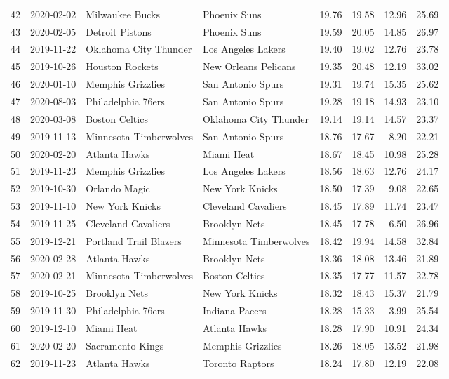 \documentclass[
  11pt,
]{article}
\theoremstyle{nonumberplain}
\begin{document}
\begin{longtable}{rl|llr|rrr}
42 & 2020-02-02 & Milwaukee Bucks & Phoenix Suns & 19.76 & 19.58 & 12.96 & 25.69\\
43 & 2020-02-05 & Detroit Pistons & Phoenix Suns & 19.59 & 20.05 & 14.85 & 26.97\\
44 & 2019-11-22 & Oklahoma City Thunder & Los Angeles Lakers & 19.40 & 19.02 & 12.76 & 23.78\\
45 & 2019-10-26 & Houston Rockets & New Orleans Pelicans & 19.35 & 20.48 & 12.19 & 33.02\\
46 & 2020-01-10 & Memphis Grizzlies & San Antonio Spurs & 19.31 & 19.74 & 15.35 & 25.62\\
47 & 2020-08-03 & Philadelphia 76ers & San Antonio Spurs & 19.28 & 19.18 & 14.93 & 23.10\\
48 & 2020-03-08 & Boston Celtics & Oklahoma City Thunder & 19.14 & 19.14 & 14.57 & 23.37\\
49 & 2019-11-13 & Minnesota Timberwolves & San Antonio Spurs & 18.76 & 17.67 & 8.20 & 22.21\\
50 & 2020-02-20 & Atlanta Hawks & Miami Heat & 18.67 & 18.45 & 10.98 & 25.28\\
51 & 2019-11-23 & Memphis Grizzlies & Los Angeles Lakers & 18.56 & 18.63 & 12.76 & 24.17\\
52 & 2019-10-30 & Orlando Magic & New York Knicks & 18.50 & 17.39 & 9.08 & 22.65\\
53 & 2019-11-10 & New York Knicks & Cleveland Cavaliers & 18.45 & 17.89 & 11.74 & 23.47\\
54 & 2019-11-25 & Cleveland Cavaliers & Brooklyn Nets & 18.45 & 17.78 & 6.50 & 26.96\\
55 & 2019-12-21 & Portland Trail Blazers & Minnesota Timberwolves & 18.42 & 19.94 & 14.58 & 32.84\\
56 & 2020-02-28 & Atlanta Hawks & Brooklyn Nets & 18.36 & 18.08 & 13.46 & 21.89\\
57 & 2020-02-21 & Minnesota Timberwolves & Boston Celtics & 18.35 & 17.77 & 11.57 & 22.78\\
58 & 2019-10-25 & Brooklyn Nets & New York Knicks & 18.32 & 18.43 & 15.37 & 21.79\\
59 & 2019-11-30 & Philadelphia 76ers & Indiana Pacers & 18.28 & 15.33 & 3.99 & 25.54\\
60 & 2019-12-10 & Miami Heat & Atlanta Hawks & 18.28 & 17.90 & 10.91 & 24.34\\
61 & 2020-02-20 & Sacramento Kings & Memphis Grizzlies & 18.26 & 18.05 & 13.52 & 21.98\\
62 & 2019-11-23 & Atlanta Hawks & Toronto Raptors & 18.24 & 17.80 & 12.19 & 22.08\\

\end{longtable}
\end{document}
